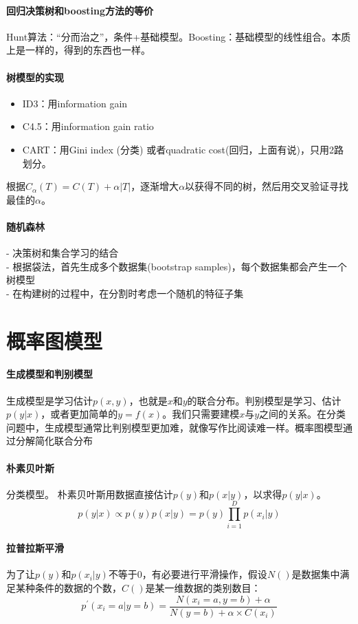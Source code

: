 \paragraph{回归决策树和boosting方法的等价}
Hunt算法：“分而治之”，条件+基础模型。Boosting：基础模型的线性组合。本质上是一样的，得到的东西也一样。

\paragraph{树模型的实现}
\begin{itemize}
    \item ID3：用information gain
    \item C4.5：用information gain ratio
    \item CART：用Gini index (分类) 或者quadratic cost(回归，上面有说)，只用2路划分。
\end{itemize}
根据$C_\alpha(T) = C(T) + \alpha|T|$，逐渐增大$\alpha$以获得不同的树，然后用交叉验证寻找最佳的$\alpha$。

\paragraph{随机森林}
- 决策树和集合学习的结合 \\
- 根据袋法，首先生成多个数据集(bootstrap samples)，每个数据集都会产生一个树模型\\
- 在构建树的过程中，在分割时考虑一个随机的特征子集

\section{概率图模型}
\paragraph{生成模型和判别模型}
生成模型是学习估计$p(x,y)$，也就是$x$和$y$的联合分布。判别模型是学习、估计$p(y|x)$，或者更加简单的$y=f(x)$。我们只需要建模$x$与$y$之间的关系。在分类问题中，生成模型通常比判别模型更加难，就像写作比阅读难一样。概率图模型通过分解简化联合分布 

\paragraph{朴素贝叶斯} 分类模型。
朴素贝叶斯用数据直接估计$p(y)$和$p(x|y)$，以求得$p(y|x)$。
$$p(y|x) \propto p(y)p(x|y) = p(y)\prod_{i=1}^D p(x_i|y)$$

\paragraph{拉普拉斯平滑}
为了让$p(y)$和$p(x_i|y)$不等于0，有必要进行平滑操作，假设$N()$是数据集中满足某种条件的数据的个数，$C()$是某一维数据的类别数目：
$$p^\prime(x_i = a|y = b) = \frac{N(x_i = a, y = b) + \alpha}{N(y = b) + \alpha \times C(x_i)}$$

